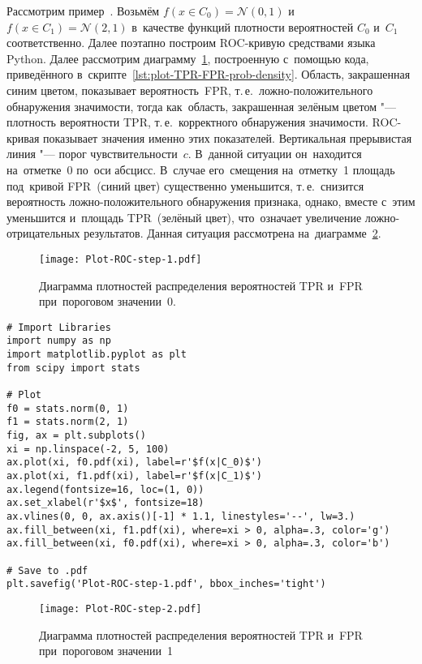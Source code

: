 \documentclass[]{scrreprt}
\begin{document}
Рассмотрим пример~\cite{AUC-Derivation}.  Возьмём  $f(x\in C_{0}) = \mathcal{N}(0,1)$ и~$f(x\in C_{1}) = \mathcal{N}(2,1)$ в~качестве функций плотности вероятностей $C_{0}$ и~$C_{1}$ соответственно. Далее поэтапно построим ROC-кривую средствами языка Python. Далее рассмотрим диаграмму~\ref{fig:plot-TPR-FPR-prob-density-1}, построенную с~помощью кода, приведённого в~скрипте~\ref{lst:plot-TPR-FPR-prob-density}. Область, закрашенная синим цветом, показывает вероятность~FPR, т.\,е.~ложно-положительного обнаружения значимости, тогда как~область, закрашенная зелёным цветом "--- плотность вероятности TPR, т.\,е.~корректного обнаружения значимости. ROC-кривая показывает значения именно этих показателей. Вертикальная прерывистая линия "--- порог чувствительности~$c$. В~данной ситуации он~находится на~отметке~0 по~оси абсцисс. В~случае его~смещения на~отметку~1 площадь под~кривой FPR~(синий цвет) существенно уменьшится, т.\,е.~снизится вероятность ложно-положительного обнаружения признака, однако, вместе с~этим уменьшится и~площадь TPR~(зелёный цвет), что~означает увеличение ложно-отрицательных результатов. Данная ситуация рассмотрена на~диаграмме~\ref{fig:plot-TPR-FPR-prob-density-2}.  
%
\begin{figure}[ht]
	\centering
	\texttt{[image: Plot-ROC-step-1.pdf]}
	\caption{Диаграмма плотностей распределения вероятностей TPR и~FPR при~пороговом значении~0.}
	\label{fig:plot-TPR-FPR-prob-density-1}
\end{figure}
%
\begin{lstlisting}[float, caption = Построение диаграммы плотностей распределения вероятностей TPR и~FPR, firstnumber=1, label= lst:plot-TPR-FPR-prob-density]
# Import Libraries
import numpy as np
import matplotlib.pyplot as plt
from scipy import stats

# Plot
f0 = stats.norm(0, 1)
f1 = stats.norm(2, 1)
fig, ax = plt.subplots()
xi = np.linspace(-2, 5, 100)
ax.plot(xi, f0.pdf(xi), label=r'$f(x|C_0)$')
ax.plot(xi, f1.pdf(xi), label=r'$f(x|C_1)$')
ax.legend(fontsize=16, loc=(1, 0))
ax.set_xlabel(r'$x$', fontsize=18)
ax.vlines(0, 0, ax.axis()[-1] * 1.1, linestyles='--', lw=3.)
ax.fill_between(xi, f1.pdf(xi), where=xi > 0, alpha=.3, color='g')
ax.fill_between(xi, f0.pdf(xi), where=xi > 0, alpha=.3, color='b')

# Save to .pdf
plt.savefig('Plot-ROC-step-1.pdf', bbox_inches='tight')
\end{lstlisting}
%
\begin{figure}[ht]
	\centering
	\texttt{[image: Plot-ROC-step-2.pdf]}
	\caption{Диаграмма плотностей распределения вероятностей TPR и~FPR при~пороговом значении~1}
	\label{fig:plot-TPR-FPR-prob-density-2}
\end{figure}
%
\end{document}
